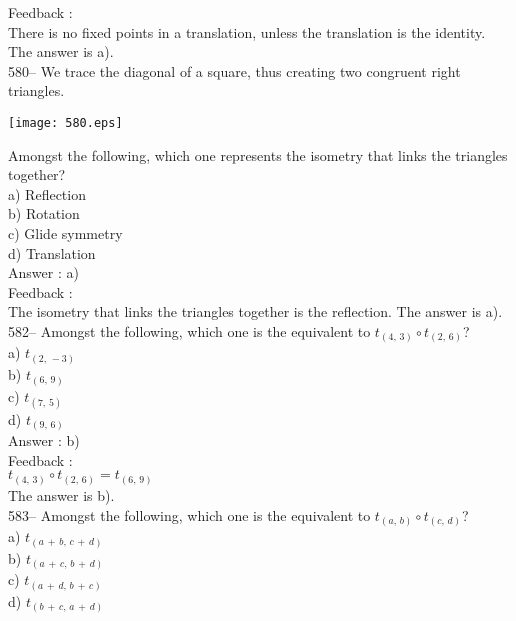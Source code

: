 \documentclass[letterpaper, 12pt]{article}
\begin{document}
Feedback : \\
There is no fixed points in a translation, unless the translation is the identity.  The answer is a).\\

580-- We trace the diagonal of a square, thus creating two congruent right triangles.\\
\begin{center}
    \texttt{[image: 580.eps]}
    \end{center}
Amongst the following, which one represents the isometry that links the triangles together?\\
a) Reflection\\
b) Rotation\\
c) Glide symmetry \\
d) Translation\\

Answer : a) \\

Feedback : \\
The isometry that links the triangles together is the reflection.  The answer is a).\\


582-- Amongst the following, which one is the equivalent to
$t_{\left(4,\,3\right)} \circ t_{\left(2,\,6\right) }$?\\
a) $t_{\left(2,\,-3\right) }$\\
b) $t_{\left(6,\,9\right) }$\\
c) $t_{\left(7,\,5\right) }$\\
d) $t_{\left(9,\,6\right) }$\\

Answer : b)\\

Feedback : \\
$t_{\left(4,\,3\right)} \circ t_{\left(2,\,6\right) }= t_{\left(6,\,9\right)
}$\\
The answer is b).\\

583-- Amongst the following, which one is the equivalent to
$t_{\left(a,\,b\right)} \circ t_{\left(c,\,d\right) }$?\\
a) $t_{\left(a\,+\,b,\,c\,+\,d\right) }$\\
b) $t_{\left(a\,+\,c,\,b\,+\,d\right) }$\\
c) $t_{\left(a\,+\,d,\,b\,+\,c\right) }$\\
d) $t_{\left(b\,+\,c,\,a\,+\,d\right) }$\\
\end{document}
